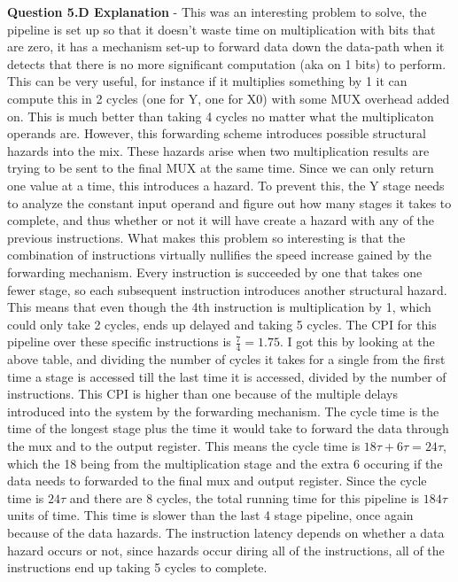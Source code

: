 \documentclass[a4paper,11pt]{article}
\begin{document}
\textbf{Question 5.D Explanation} - This was an interesting problem to solve, the pipeline is set up so that it doesn't waste time on multiplication with bits that are zero, it has a mechanism set-up to forward data down the data-path when it detects that there is no more significant computation (aka on 1 bits) to perform. This can be very useful, for instance if it multiplies something by 1 it can compute this in 2 cycles (one for Y, one for X0) with some MUX overhead added on. This is much better than taking 4 cycles no matter what the multiplicaton operands are. However, this forwarding scheme introduces possible structural hazards into the mix. These hazards arise when two multiplication results are trying to be sent to the final MUX at the same time. Since we can only return one value at a time, this introduces a hazard. To prevent this, the Y stage needs to analyze the constant input operand and figure out how many stages it takes to complete, and thus whether or not it will have create a hazard with any of the previous instructions. What makes this problem so interesting is that the combination of instructions virtually nullifies the speed increase gained by the forwarding mechanism. Every instruction is succeeded by one that takes one fewer stage, so each subsequent instruction introduces another structural hazard. This means that even though the 4th instruction is multiplication by 1, which could only take 2 cycles, ends up delayed and taking 5 cycles. The CPI for this pipeline over these specific instructions is $\frac{7}{4} = 1.75$. I got this by looking at the above table, and dividing the number of cycles it takes for a single from the first time a stage is accessed till the last time it is accessed, divided by the number of instructions. This CPI is higher than one because of the multiple delays introduced into the system by the forwarding mechanism. The cycle time is the time of the longest stage plus the time it would take to forward the data through the mux and to the output register. This means the cycle time is $18\tau + 6\tau = 24\tau$, which the 18 being from the multiplication stage and the extra 6 occuring if the data needs to forwarded to the final mux and output register. Since the cycle time is $24\tau$ and there are 8 cycles, the total running time for this pipeline is $184\tau$ units of time. This time is slower than the last 4 stage pipeline, once again because of the data hazards. The instruction latency depends on whether a data hazard occurs or not, since hazards occur diring all of the instructions, all of the instructions end up taking 5 cycles to complete. 
\end{document}

